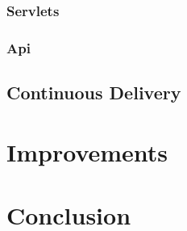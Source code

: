 \documentclass[a4paper,11pt,pdftex,halfparskip,cleardoubleempty]{scrbook}
\begin{document}
\subsubsection{Servlets}
\subsubsection{Api}


\subsection{Continuous Delivery}

\section{Improvements}

\section{Conclusion}


\nocite{*}



\end{document}
